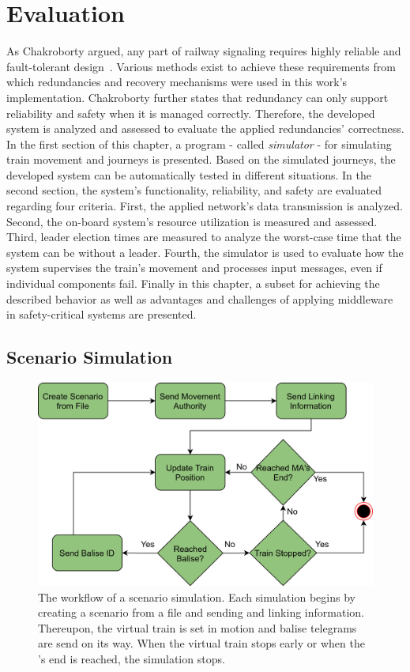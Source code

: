 \chapter{Evaluation}
\label{cpt:evaluation}

As Chakroborty argued, any part of railway signaling requires highly reliable and fault-tolerant design~\cite{ChakrabortyFaultTolerantRailway}.
Various methods exist to achieve these requirements from which redundancies and recovery mechanisms were used in this work's implementation.
Chakroborty further states that redundancy can only support reliability and safety when it is managed correctly.
Therefore, the developed system is analyzed and assessed to evaluate the applied redundancies' correctness.
\\

In the first section of this chapter, a program - called \textit{simulator} - for simulating train movement and journeys is presented.
Based on the simulated journeys, the developed system can be automatically tested in different situations.
In the second section, the system's functionality, reliability, and safety are evaluated regarding four criteria.
First, the applied network's data transmission is analyzed.
Second, the on-board system's resource utilization is measured and assessed.
Third, leader election times are measured to analyze the worst-case time that the system can be without a leader.
Fourth, the simulator is used to evaluate how the system supervises the train's movement and processes input messages, even if individual components fail.
Finally in this chapter, a  subset for achieving the described behavior as well as advantages and challenges of applying  middleware in safety-critical systems are presented.


\section{Scenario Simulation}
\label{subsec:ScenarioSimulation}

\begin{figure}[!htb]
	\centering
	\includegraphics[width=0.8\linewidth]{images/SimulatorWorkflow}
	\caption{The workflow of a scenario simulation. Each simulation begins by creating a scenario from a file and sending  and linking information. Thereupon, the virtual train is set in motion and balise telegrams are send on its way. When the virtual train stops early or when the 's end is reached, the simulation stops.}
	\label{fig:SimulatorWorkflow}
\end{figure}

